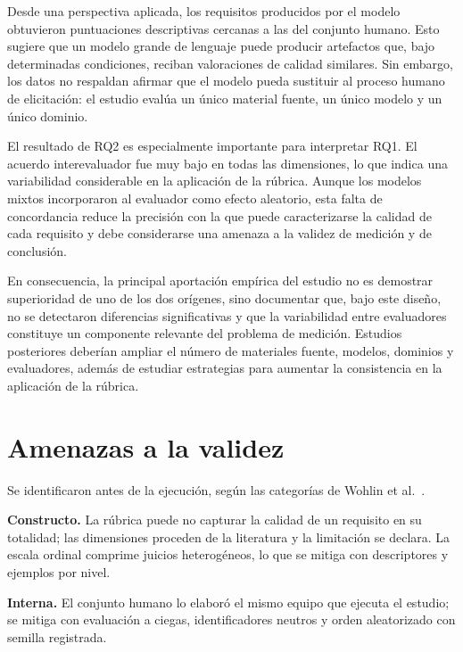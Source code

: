 \documentclass[runningheads]{llncs}
\begin{document}
Desde una perspectiva aplicada, los requisitos producidos por el modelo obtuvieron
puntuaciones descriptivas cercanas a las del conjunto humano. Esto sugiere que un
modelo grande de lenguaje puede producir artefactos que, bajo determinadas
condiciones, reciban valoraciones de calidad similares. Sin embargo, los datos no
respaldan afirmar que el modelo pueda sustituir al proceso humano de elicitaci\'on:
el estudio eval\'ua un \'unico material fuente, un \'unico modelo y un \'unico
dominio.

El resultado de RQ2 es especialmente importante para interpretar RQ1. El acuerdo
interevaluador fue muy bajo en todas las dimensiones, lo que indica una variabilidad
considerable en la aplicaci\'on de la r\'ubrica. Aunque los modelos mixtos
incorporaron al evaluador como efecto aleatorio, esta falta de concordancia reduce
la precisi\'on con la que puede caracterizarse la calidad de cada requisito y debe
considerarse una amenaza a la validez de medici\'on y de conclusi\'on.

En consecuencia, la principal aportaci\'on emp\'irica del estudio no es demostrar
superioridad de uno de los dos or\'igenes, sino documentar que, bajo este dise\~no,
no se detectaron diferencias significativas y que la variabilidad entre
evaluadores constituye un componente relevante del problema de medici\'on.
Estudios posteriores deber\'ian ampliar el n\'umero de materiales fuente, modelos,
dominios y evaluadores, adem\'as de estudiar estrategias para aumentar la
consistencia en la aplicaci\'on de la r\'ubrica.

\section{Amenazas a la validez}

Se identificaron antes de la ejecuci\'on, seg\'un las categor\'ias de Wohlin et
al.\ \cite{wohlin2012}.

\textbf{Constructo.} La r\'ubrica puede no capturar la calidad de un requisito en su
totalidad; las dimensiones proceden de la literatura \cite{iso29148,montgomery2022} y
la limitaci\'on se declara. La escala ordinal comprime juicios heterog\'eneos, lo que
se mitiga con descriptores y ejemplos por nivel.

\textbf{Interna.} El conjunto humano lo elabor\'o el mismo equipo que ejecuta el
estudio; se mitiga con evaluaci\'on a ciegas, identificadores neutros y orden
aleatorizado con semilla registrada.
\end{document}
